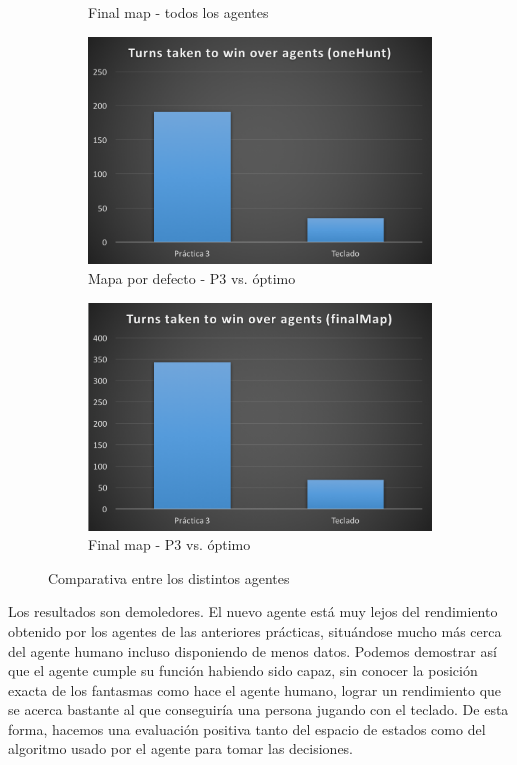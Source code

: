 \documentclass[12pt]{article}
\begin{document}
\begin{figure}[h]
\begin{subfigure}{.5\textwidth}
        \caption{Final map - todos los agentes}
        \label{fig:sub2}
    \end{subfigure}
    \begin{subfigure}{.5\textwidth}
        \centering
        \includegraphics[width=.85\linewidth]{bmap_d}
        \caption{Mapa por defecto - P3 vs. óptimo}
        \label{fig:sub3}
    \end{subfigure}%
    \begin{subfigure}{.5\textwidth}
        \centering
        \includegraphics[width=.85\linewidth]{fmap_d}
        \caption{Final map - P3 vs. óptimo}
        \label{fig:sub4}
    \end{subfigure}
    \caption{Comparativa entre los distintos agentes}
    \label{fig:test}
\end{figure}

Los resultados son demoledores. El nuevo agente está muy lejos del rendimiento obtenido por los agentes de las anteriores prácticas, situándose mucho más cerca del agente humano incluso disponiendo de menos datos. Podemos demostrar así que el agente cumple su función habiendo sido capaz, sin conocer la posición exacta de los fantasmas como hace el agente humano, lograr un rendimiento que se acerca bastante al que conseguiría una persona jugando con el teclado. De esta forma, hacemos una evaluación positiva tanto del espacio de estados como del algoritmo usado por el agente para tomar las decisiones.
\end{document}
